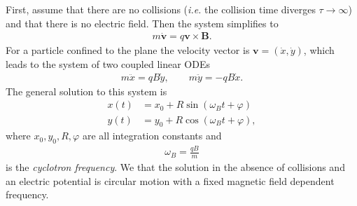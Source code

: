         First, assume that there are no collisions (\textit{i.e.} the collision time diverges $\tau \rightarrow\infty$) and that there is no electric field. Then the system simplifies to
        \begin{align}
            m\dot{\bm{v}} =q \bm{v}\times \bm{B}.
        \end{align}
        For a particle confined to the plane the velocity vector is $\bm{v} = (\dot{x}, \dot{y})$, which leads to the system of two coupled linear ODEs
        \begin{align}
            m \ddot{x} = q B \dot{y}, \qquad m \ddot{y}= -q B \dot{x}.
        \end{align}
        The general solution to this system is
        \begin{align}
            x(t) &= x_0 + R \sin\left(\omega_Bt + \varphi \right) \\
            y(t) &= y_0 + R \cos\left(\omega_Bt + \varphi \right),
        \end{align}
        where $x_0, y_0, R, \varphi$ are all integration constants and
        \begin{align}
            \omega_B = \frac{q B}{m}
        \end{align}
        is the \textit{cyclotron frequency}.
        We that the solution in the absence of collisions and an electric potential is circular motion with a fixed magnetic field dependent frequency.

